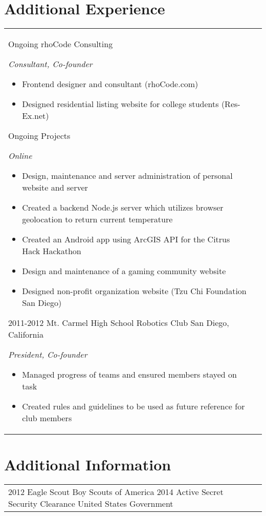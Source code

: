 \documentclass[print]{friggeri-cv} %
\makeatletter
\renewenvironment{entrylist}{%
\par\begin{tabular*}{\textwidth}{@{\extracolsep{\fill}}ll}
}{%
\end{tabular*}\par
}
\makeatother
\begin{document}
\section{Additional Experience}

\begin{entrylist}
\entry
{Ongoing}
{rhoCode Consulting}
{ }
{\emph{Consultant, Co-founder}
\begin{itemize}
\item Frontend designer and consultant (rhoCode.com)
\item Designed residential listing website for college students (Res-Ex.net)
\end{itemize}}
\entry
{Ongoing}
{Projects}
{ }
{\emph{Online}
\begin{itemize}
\item Design, maintenance and server administration of personal website and server
\item Created a backend Node.js server which utilizes browser geolocation to return current temperature
\item Created an Android app using ArcGIS API for the Citrus Hack Hackathon
\item Design and maintenance of a gaming community website
\item Designed non-profit organization website (Tzu Chi Foundation San Diego)
\end{itemize}}
\entry
{2011-2012}
{Mt. Carmel High School Robotics Club}
{San Diego, California}
{\emph{President, Co-founder}
\begin{itemize}
\item Managed progress of teams and ensured members stayed on task
\item Created rules and guidelines to be used as future reference for club members
\end{itemize}}

\end{entrylist}


\section{Additional Information}

\begin{entrylist}
\entry
{2012}
{Eagle Scout}
{Boy Scouts of America}
{}
\entry
{2014}
{Active Secret Security Clearance}
{United States Government}
{}
\end{entrylist}


\end{document}
